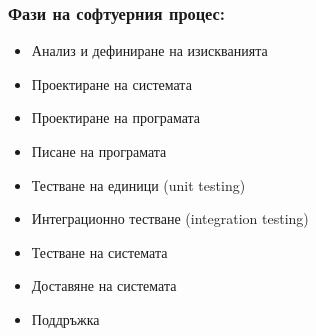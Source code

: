 \documentclass[fleqn,12pt]{article}
\begin{document}
\subsubsection{Фази на софтуерния процес:}
\begin{itemize}
	\item Анализ и дефиниране на изискванията
	\item Проектиране на системата
	\item Проектиране на програмата
	\item Писане на програмата
	\item Тестване на единици (unit testing)
	\item Интеграционно тестване (integration testing)
	\item Тестване на системата
	\item Доставяне на системата
	\item Поддръжка
\end{itemize}
\end{document}
